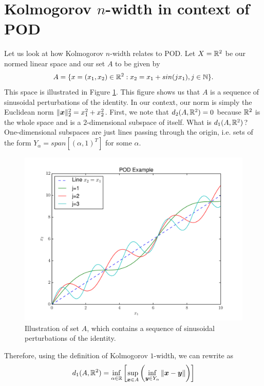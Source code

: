 \section{Kolmogorov $n$-width in context of POD}
Let us look at how Kolmogorov $n$-width relates to POD. Let $X=\mathbb{R}^2$ be our normed linear space and our set $A$ to be given by
\begin{align*}
    A = \{x=(x_1,x_2)\in \mathbb{R}^2 : x_2 = x_1 + sin(j x_1), j \in \mathbb{N}\}.
\end{align*}
This space is illustrated in Figure \ref{fig:19:A}. This figure shows us that $A$ is a sequence of sinusoidal perturbations of the identity. In our context, our norm is simply the Euclidean norm $\|\boldsymbol{x}\|_2^{2} = x_1^2 + x_2^2$. First, we note that $d_2(A,\mathbb{R}^2) = 0$ because $\mathbb{R}^2$ is the whole space and is a $2$-dimensional subspace of itself. What is $d_1(A,\mathbb{R}^2)$? One-dimensional subspaces are just lines passing through the origin, i.e. sets of the form $Y_{\alpha} = span\left[(\alpha, 1)^{T}\right]$ for some $\alpha$. 
\begin{figure}
    \centering
    \includegraphics[width=\textwidth]{images/pod.pdf}
    \caption{Illustration of set $A$, which contains a sequence of sinusoidal perturbations of the identity.}
    \label{fig:19:A}
\end{figure}
Therefore, using the definition of Kolmogorov $1$-width, we can rewrite as
\begin{align} \label{eqn:19:kol1width}
d_1(A,\mathbb{R}^2) = \inf_{\alpha \in \mathbb{R}} \left[ \sup_{\boldsymbol{x} \in A} \left(\inf_{\boldsymbol{y} \in Y_{\alpha}} \|\boldsymbol{x}-\boldsymbol{y}\|\right)\right]
\end{align}
